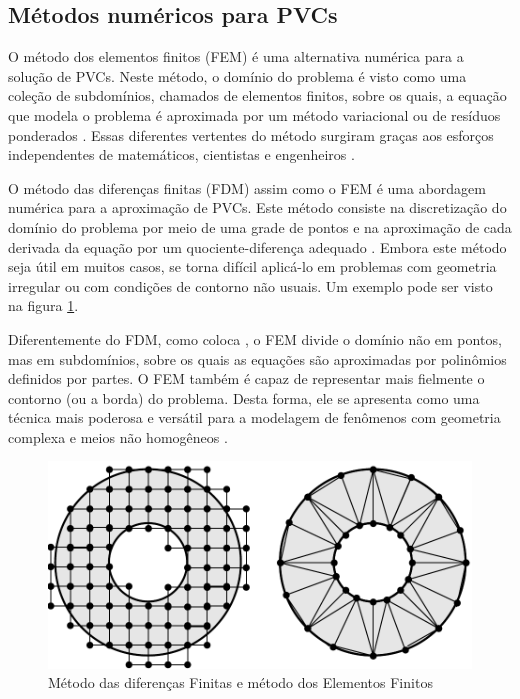 \documentclass[
    12pt,               %
    openright,          %
    oneside,
    a4paper,            %
    english,            %
    french,             %
    spanish,            %
    brazil              %
    ]{abntex2}
\begin{document}
\subsection{Métodos numéricos para PVCs}
\label{sec:FEM}

O método dos elementos finitos (FEM) é uma alternativa numérica para a solução de PVCs. Neste método, o domínio do problema é visto como uma coleção de subdomínios, chamados de elementos finitos, sobre os quais, a equação que modela o problema é aproximada por um método variacional ou de resíduos ponderados . Essas diferentes vertentes do método surgiram graças aos esforços independentes de matemáticos, cientistas e engenheiros \cite{zien}. 

O método das diferenças finitas (FDM) assim como o FEM é uma abordagem numérica para a aproximação de PVCs. Este método consiste na discretização do domínio do problema por meio de uma grade de pontos e na aproximação de cada derivada da equação por um quociente-diferença adequado
\cite{burdenFaires}. Embora este método seja útil em muitos casos, se torna difícil aplicá-lo em problemas com geometria irregular ou com condições de contorno não usuais. Um exemplo pode ser visto na figura \ref{fig:mdfFem}.

Diferentemente do FDM, como coloca , o FEM divide o domínio não em pontos, mas em subdomínios, sobre os quais as equações são aproximadas por polinômios definidos por partes. O FEM também é capaz de representar mais fielmente o contorno (ou a borda) do problema. Desta forma, ele se apresenta como uma técnica mais poderosa e versátil para a modelagem de fenômenos com geometria complexa e meios não homogêneos \cite{sadiku}. 

\begin{figure}[!htb]
	\centering
	\includegraphics[scale=0.5]{figuras/fdm_fem.pdf}
	\caption{Método das diferenças Finitas e método dos Elementos Finitos}
	\label{fig:mdfFem}
\end{figure}
\end{document}
